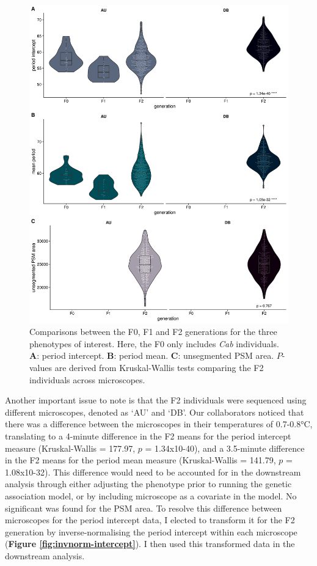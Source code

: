 \documentclass[
]{book}
\begin{document}
\begin{figure}
\includegraphics[width=1\linewidth]{figs/somites/phenotypes} \caption{Comparisons between the F0, F1 and F2 generations for the three phenotypes of interest. Here, the F0 only includes \emph{Cab} individuals. \textbf{A}: period intercept. \textbf{B}: period mean. \textbf{C}: unsegmented PSM area. \(P\)-values are derived from Kruskal-Wallis tests comparing the F2 individuals across microscopes.}\label{fig:somite-phenos}
\end{figure}

Another important issue to note is that the F2 individuals were sequenced using different microscopes, denoted as `AU' and `DB'. Our collaborators noticed that there was a difference between the microscopes in their temperatures of 0.7-0.8°C, translating to a 4-minute difference in the F2 means for the period intercept measure (Kruskal-Wallis = 177.97, \(p\) = 1.34x10-40), and a 3.5-minute difference in the F2 means for the period mean measure (Kruskal-Wallis = 141.79, \(p\) = 1.08x10-32). This difference would need to be accounted for in the downstream analysis through either adjusting the phenotype prior to running the genetic association model, or by including microscope as a covariate in the model. No significant was found for the PSM area. To resolve this difference between microscopes for the period intercept data, I elected to transform it for the F2 generation by inverse-normalising the period intercept within each microscope (\textbf{Figure \ref{fig:invnorm-intercept}}). I then used this transformed data in the downstream analysis.
\end{document}
